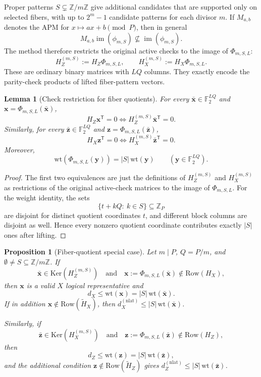 \documentclass[11pt]{article}
\newcommand{\Ftwo}{\mathbb{F}_2}
\newcommand{\Z}{\mathbb{Z}}
\newcommand{\Ker}{\mathrm{Ker}}
\newcommand{\Row}{\mathrm{Row}}
\newcommand{\wt}{\mathrm{wt}}
\newcommand{\Htil}{\tilde{H}}
\newcommand{\vect}[1]{\bm{#1}}
\newcommand{\vx}{\vect{x}}
\newcommand{\vy}{\vect{y}}
\newcommand{\vz}{\vect{z}}
\theoremstyle{uprightthm}
\newtheorem{lemma}[theorem]{Lemma}
\newtheorem{proposition}[theorem]{Proposition}
\begin{document}
Proper patterns $S\subsetneq\Z/m\Z$ give additional candidates that are
supported only on selected fibers, with up to $2^m-1$ candidate patterns for
each divisor $m$.  If $M_{a,b}$ denotes the APM for
$x\mapsto ax+b\pmod P$, then in general
\[
M_{a,b}\operatorname{im}(\phi_{m,S})\not\subseteq \operatorname{im}(\phi_{m,S}).
\]
The method therefore restricts the original active checks to the image of $\Phi_{m,S,L}$:
\[
H_{Z}^{(m,S)}:=H_Z\Phi_{m,S,L},\qquad
H_{X}^{(m,S)}:=H_X\Phi_{m,S,L}.
\]
These are ordinary binary matrices with $LQ$ columns.  They exactly encode the
parity-check products of lifted fiber-pattern vectors.

\begin{lemma}[Check restriction for fiber quotients]
\label{lem:fiber-quotient-syndrome-en}
For every $\bar{\vx}\in\Ftwo^{LQ}$ and
$\vx=\Phi_{m,S,L}(\bar{\vx})$,
\[
H_Z\vx^{\mathsf T}=0
\iff
H_Z^{(m,S)}\bar{\vx}^{\mathsf T}=0.
\]
Similarly, for every $\bar{\vz}\in\Ftwo^{LQ}$ and
$\vz=\Phi_{m,S,L}(\bar{\vz})$,
\[
H_X\vz^{\mathsf T}=0
\iff
H_X^{(m,S)}\bar{\vz}^{\mathsf T}=0.
\]
Moreover,
\[
\wt(\Phi_{m,S,L}(\vy))=|S|\,\wt(\vy)
\qquad(\vy\in\Ftwo^{LQ}).
\]
\end{lemma}

\begin{proof}
The first two equivalences are just the definitions of
$H_Z^{(m,S)}$ and $H_X^{(m,S)}$ as restrictions of the original active-check
matrices to the image of $\Phi_{m,S,L}$.
For the weight identity, the sets
\[
\{t+kQ:\ k\in S\}\subseteq \Z_P
\]
are disjoint for distinct quotient coordinates $t$, and different block
columns are disjoint as well.  Hence every nonzero quotient coordinate
contributes exactly $|S|$ ones after lifting.
\end{proof}

\begin{proposition}[Fiber-quotient special case]
\label{prop:fiber-quotient-upper-en}
Let $m\mid P$, $Q=P/m$, and $\emptyset\ne S\subseteq\Z/m\Z$.
If
\[
\bar{\vx}\in\Ker(H_Z^{(m,S)})
\quad\text{and}\quad
\vx:=\Phi_{m,S,L}(\bar{\vx})\notin\Row(H_X),
\]
then $\vx$ is a valid $X$ logical representative and
\[
d_X\le \wt(\vx)=|S|\,\wt(\bar{\vx}).
\]
If in addition $\vx\notin\Row(\Htil_X)$, then
$d_X^{(\mathrm{nlat})}\le |S|\,\wt(\bar{\vx})$.

Similarly, if
\[
\bar{\vz}\in\Ker(H_X^{(m,S)})
\quad\text{and}\quad
\vz:=\Phi_{m,S,L}(\bar{\vz})\notin\Row(H_Z),
\]
then
\[
d_Z\le \wt(\vz)=|S|\,\wt(\bar{\vz}),
\]
and the additional condition $\vz\notin\Row(\Htil_Z)$ gives
$d_Z^{(\mathrm{nlat})}\le |S|\,\wt(\bar{\vz})$.
\end{proposition}
\end{document}
